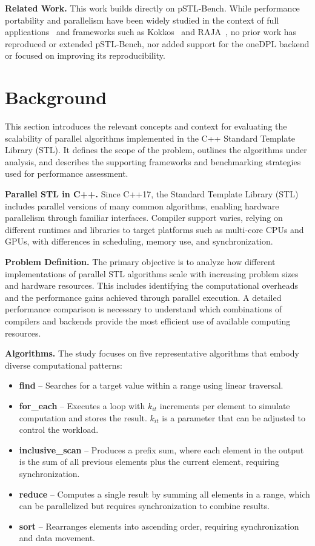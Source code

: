 \documentclass[sigconf]{acmart}
\newcommand{\mypar}[1]{{\bf #1.}}
\begin{document}
\mypar{Related Work} This work builds directly on pSTL-Bench.
While performance portability and parallelism have been widely studied in
the context of full applications~\cite{app} and frameworks such as Kokkos~\cite{Kokkos}
and RAJA~\cite{RAJA}, no prior work has reproduced or extended pSTL-Bench,
nor added support for the oneDPL backend or focused on improving its reproducibility.

\section{Background}\label{sec:background}
This section introduces the relevant concepts and context for evaluating the
scalability of parallel algorithms implemented in the C++ Standard Template
Library (STL). It defines the scope of the problem, outlines the algorithms
under analysis, and describes the supporting frameworks and benchmarking
strategies used for performance assessment.

\mypar{Parallel STL in C++} Since C++17, the Standard Template Library (STL) includes parallel versions
of many common algorithms, enabling hardware parallelism through
familiar interfaces. Compiler support varies, relying on different
runtimes and libraries to target platforms such as multi-core CPUs
and GPUs, with differences in scheduling, memory use, and synchronization.

\mypar{Problem Definition} The primary objective is to analyze how different implementations
of parallel STL algorithms scale with increasing problem sizes and hardware resources.
This includes identifying the computational overheads and the performance gains achieved
through parallel execution. A detailed performance comparison is necessary to understand
which combinations of compilers and backends provide the most efficient use of available
computing resources.

\mypar{Algorithms} The study focuses on five representative algorithms that embody diverse computational patterns:
\begin{itemize}
      \item \textbf{find} – Searches for a target value within a range using linear traversal.
      \item \textbf{for\_each} – Executes a loop with $k_{it}$ increments per element to simulate computation and stores the result.
            $k_{it}$ is a parameter that can be adjusted to control the workload.
      \item \textbf{inclusive\_scan} – Produces a prefix sum, where each element in the output is the sum of all previous elements
            plus the current element, requiring synchronization.
      \item \textbf{reduce} – Computes a single result by summing all elements in a range, which can be parallelized
            but requires synchronization to combine results.
      \item \textbf{sort} – Rearranges elements into ascending order, requiring synchronization and data movement.
\end{itemize}
\end{document}
